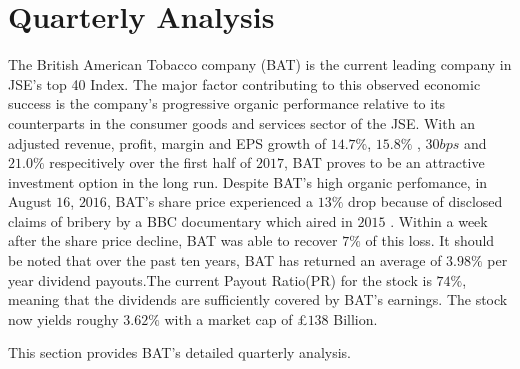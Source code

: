 \documentclass[letterpaper, 10 pt, conference]{ieeeconf}  %
\begin{document}
 \section{ Quarterly Analysis}	
 \begin{flushleft}
 	The British American Tobacco company (BAT) is the current leading company in JSE's top 40 Index. The major factor contributing to this observed economic success is the company's progressive organic performance relative to its counterparts in the consumer goods and services sector of the JSE.  With  an adjusted revenue, profit, margin and EPS growth of $14.7\%$, $15.8\%$ , $30 bps$ and $21.0\%$ respecitively over the first half of $2017$, BAT proves to be an attractive investment option in the long run\cite{interimResults}. Despite BAT's high organic perfomance, in August $16$, $2016$, BAT's share price experienced a $13\%$ drop because of disclosed claims of bribery by a BBC documentary which aired in $2015$ \cite{Jonathan_Weber}. Within a week after the share price decline,  BAT was able to recover $7\%$ of this loss\cite{interimResults}.  
 	It should be noted that over the past ten years, BAT has returned an average of $3.98\%$ per year dividend payouts.The current Payout Ratio(PR) for the stock is $74\%$, meaning that the dividends are sufficiently covered by BAT's earnings. The stock now yields roughy $3.62\%$ with a market cap of \pounds $138$ Billion\cite{BAT_partOfYourPort}. 
 	
 	This section provides BAT's detailed quarterly analysis.
 \end{flushleft}
 
\end{document}
